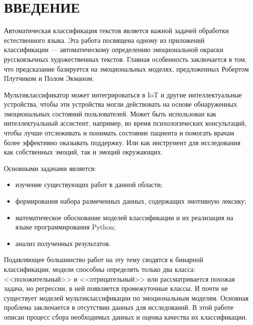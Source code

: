 \chapter*{ВВЕДЕНИЕ}
\vspace*{-0.5cm}


Автоматическая классификация текстов является важной задачей обработки естественного языка. Эта работа посвящена одному из приложений классификации --- автоматическому определению эмоциональной окраски русскоязычных художественных текстов. Главная особенность заключается в том, что предсказание базируется на эмоциональных моделях, предложенных Робертом Плутчиком и Полом Экманом.

\bigskip
Мультиклассификатор может интегрироваться в IoT и другие интеллектуальные устройства, чтобы эти устройства могли действовать на основе обнаруженных эмоциональных состояний пользователей. Может быть использован как интеллектуальный ассистент, например, во время психологических консультаций, чтобы лучше отслеживать и понимать состояние пациента и помогать врачам более эффективно оказывать поддержку. Или как инструмент для исследования как собственных эмоций, так и эмоций окружающих.

\bigskip\noindent
Основными задачами является:

\begin{itemize}
 \item изучение существующих работ в данной области;
 \item формирования набора размеченных данных, содержащих эмотивную лексику;
 \item математическое обоснование моделей классификации и их реализация на языке программирования Python;
 \item анализ полученных результатов.
\end{itemize}

\bigskip
Подавляющее большинство работ на эту тему сводятся к бинарной классификации, модели способны определять только два класса: <<положительный>> и <<отрицательный>> или рассматривается похожая задача, но регрессии, в ней появляется промежуточные классы. И почти не существует моделей мультиклассификации по эмоциональным моделям. Основная проблема заключается в отсутствии данных для исследований. В этой работе описан процесс сбора необходимых данных и оценка качества их классификации.

